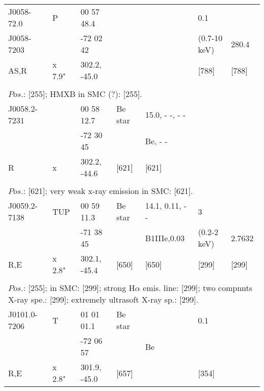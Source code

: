 \documentclass{aa}
\begin{document}
\begin{table*}[h]
\begin{tabular}{p{2.5cm}p{1cm}p{1.8cm}p{2.3cm}p{3.3cm}p{2.0cm}p{2.2cm}}
\hline
\noalign{\smallskip}
J0058-72.0      &  P        &        00 57 48.4    &                    &         & 0.1                         &                        \\
J0058-7203    &              &        -72 02 42     &                     &         &   (0.7-10 keV)      &        280.4       \\      
  AS,R              &  x 7.9" &  302.2, -45.0        &                     &         &  [788]                     &     [788]  \\
  
\\
\multicolumn{7}{p{17.5cm}}{
$Pos$.: [255];  HMXB in SMC (?): [255].   }\\

\noalign{\smallskip}
\hline
\noalign{\smallskip}
J0058.2-7231   &          &      00 58 12.7  &  Be star            & 15.0, - -, - -   &     &  \\       
                            &          &    -72 30 45      &                            &  Be, - -          &       & \\                 
R                         &    x    & 302.2, -44.6     &          [621]         &  [621]            &      &  \\
  
\\
\multicolumn{7}{p{17.5cm}}{
$Pos$.: [621];  very weak x-ray emission in SMC: [621].}\\

\noalign{\smallskip}
\hline
\noalign{\smallskip}
J0059.2-7138  &    TUP   & 00 59 11.3        &  Be star           &  14.1, 0.11, - -   &   3                         &  \\
                           &               & -71 38 45         &                           & B1IIIe,0.03       &      (0.2-2 keV)       &      2.7632  \\
R,E                    &   x 2.8"  & 302.1, -45.4    &   [650]                &        [650]          &  [299]                          &     [299]   \\
  
\\
\multicolumn{7}{p{17.5cm}}{
$Pos$.: [255]; in SMC: [299]; strong H$\alpha $ emis. line: [299]; two compnnts X-ray spe.: [299]; extremely ultrasoft 
X-ray sp.: [299].   }\\
\noalign{\smallskip}
\hline
\noalign{\smallskip}
J0101.0-7206  &    T           & 01 01 01.1   &  Be star       &               &    0.1        &       \\               
                           &                  &   -72 06 57  &                        & Be        &                   &       \\
R,E                    &     x 2.8"  & 301.9, -45.0 &   [657]            &               &    [354]      &         \\


\end{tabular}
\end{table*}
\end{document}
